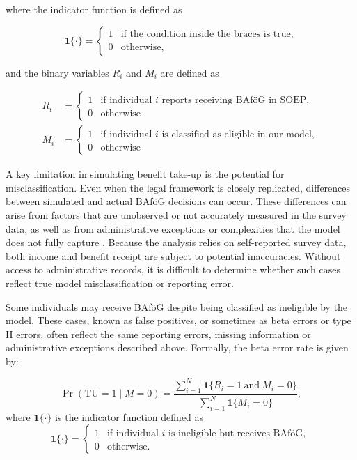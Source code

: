 where the indicator function is defined as

\begin{equation}
  \mathbf{1}\{\cdot\} =
  \begin{cases}
    1 & \text{if the condition inside the braces is true}, \\
    0 & \text{otherwise},
  \end{cases}
\end{equation}

and the binary variables \(R_i\) and \(M_i\) are defined as

\begin{equation}
\begin{aligned}
R_i &= \begin{cases}
1 & \text{if individual } i \text{ reports receiving BAföG in SOEP}, \\[4pt]
0 & \text{otherwise}
\end{cases} \\
M_i &= \begin{cases}
1 & \text{if individual } i \text{ is classified as eligible in our model}, \\[4pt]
0 & \text{otherwise}
\end{cases}
\end{aligned}
\end{equation}

A key limitation in simulating benefit take-up is the potential for misclassification. Even when the legal framework is closely replicated, differences between simulated and actual BAföG decisions can occur. These differences can arise from factors that are unobserved or not accurately measured in the survey data, as well as from administrative exceptions or complexities that the model does not fully capture \citep{frick_claim_2007, janssens_takemod_2022}. Because the analysis relies on self-reported survey data, both income and benefit receipt are subject to potential inaccuracies. Without access to administrative records, it is difficult to determine whether such cases reflect true model misclassification or reporting error.

Some individuals may receive BAföG despite being classified as ineligible by the model. These cases, known as false positives, or sometimes as beta errors or type II errors, often reflect the same reporting errors, missing information or administrative exceptions described above. Formally, the beta error rate is given by:

\begin{equation}
\Pr(\text{TU} = 1 \mid M = 0) = \frac{\sum_{i=1}^{N} \mathbf{1}\{R_i = 1 \ \text{and} \ M_i = 0\}}{\sum_{i=1}^{N} \mathbf{1}\{M_i = 0\}},
\end{equation}
where \( \mathbf{1}\{\cdot\} \) is the indicator function defined as
\[
\mathbf{1}\{\cdot\} =
\begin{cases}
1 & \text{if individual } i \text{ is ineligible but receives BAföG}, \\
0 & \text{otherwise}.
\end{cases}
\]

